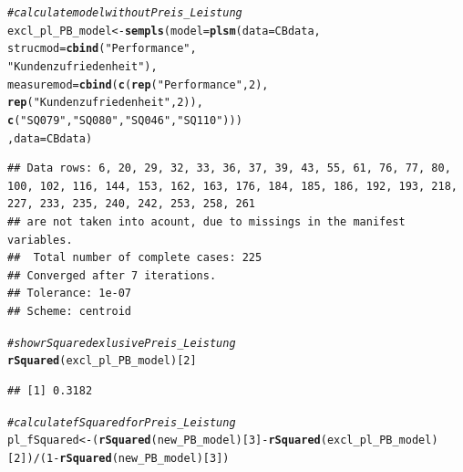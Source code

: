\documentclass{article}\usepackage[]{graphicx}\usepackage[]{color}
\makeatletter
\newcommand{\hlnum}[1]{\textcolor[rgb]{0.686,0.059,0.569}{#1}}%
\newcommand{\hlstr}[1]{\textcolor[rgb]{0.192,0.494,0.8}{#1}}%
\newcommand{\hlcom}[1]{\textcolor[rgb]{0.678,0.584,0.686}{\textit{#1}}}%
\newcommand{\hlopt}[1]{\textcolor[rgb]{0,0,0}{#1}}%
\newcommand{\hlstd}[1]{\textcolor[rgb]{0.345,0.345,0.345}{#1}}%
\newcommand{\hlkwb}[1]{\textcolor[rgb]{0.69,0.353,0.396}{#1}}%
\newcommand{\hlkwc}[1]{\textcolor[rgb]{0.333,0.667,0.333}{#1}}%
\newcommand{\hlkwd}[1]{\textcolor[rgb]{0.737,0.353,0.396}{\textbf{#1}}}%
\newenvironment{kframe}{%
 \def\at@end@of@kframe{}%
 \ifinner\ifhmode%
  \def\at@end@of@kframe{\end{minipage}}%
  \begin{minipage}{\columnwidth}%
 \fi\fi%
 \def\FrameCommand##1{\hskip\@totalleftmargin \hskip-\fboxsep
 \colorbox{shadecolor}{##1}\hskip-\fboxsep
     \hskip-\linewidth \hskip-\@totalleftmargin \hskip\columnwidth}%
 \MakeFramed {\advance\hsize-\width
   \@totalleftmargin\z@ \linewidth\hsize
   \@setminipage}}%
 {\par\unskip\endMakeFramed%
 \at@end@of@kframe}
\newenvironment{knitrout}{}{} %
\makeatother
\begin{document}
\begin{knitrout}
\color{fgcolor}\begin{kframe}
\begin{alltt}
\hlcom{#calculate model without Preis_Leistung}
\hlstd{excl_pl_PB_model} \hlkwb{<-} \hlkwd{sempls}\hlstd{(}\hlkwc{model} \hlstd{=} \hlkwd{plsm}\hlstd{(}\hlkwc{data} \hlstd{= CBdata,}
                \hlkwc{strucmod} \hlstd{=} \hlkwd{cbind}\hlstd{(}\hlstr{"Performance"}\hlstd{,}
                                 \hlstr{"Kundenzufriedenheit"}\hlstd{),}
                \hlkwc{measuremod} \hlstd{=} \hlkwd{cbind}\hlstd{(}\hlkwd{c}\hlstd{(}\hlkwd{rep}\hlstd{(}\hlstr{"Performance"}\hlstd{,}\hlnum{2}\hlstd{),}
                                     \hlkwd{rep}\hlstd{(}\hlstr{"Kundenzufriedenheit"}\hlstd{,}\hlnum{2}\hlstd{)),}
                                   \hlkwd{c}\hlstd{(}\hlstr{"SQ079"}\hlstd{,}\hlstr{"SQ080"}\hlstd{,}\hlstr{"SQ046"}\hlstd{,}\hlstr{"SQ110"}\hlstd{)))}
                \hlstd{,}\hlkwc{data} \hlstd{= CBdata)}
\end{alltt}
\begin{verbatim}
## Data rows: 6, 20, 29, 32, 33, 36, 37, 39, 43, 55, 61, 76, 77, 80, 100, 102, 116, 144, 153, 162, 163, 176, 184, 185, 186, 192, 193, 218, 227, 233, 235, 240, 242, 253, 258, 261 
## are not taken into acount, due to missings in the manifest variables.
##  Total number of complete cases: 225 
## Converged after 7 iterations.
## Tolerance: 1e-07
## Scheme: centroid
\end{verbatim}
\begin{alltt}
\hlcom{#show rSquared exlusive Preis_Leistung}
\hlkwd{rSquared}\hlstd{(excl_pl_PB_model)[}\hlnum{2}\hlstd{]}
\end{alltt}
\begin{verbatim}
## [1] 0.3182
\end{verbatim}
\begin{alltt}
\hlcom{#calculate fSquared for Preis_Leistung  }
\hlstd{pl_fSquared} \hlkwb{<-}   \hlstd{(}\hlkwd{rSquared}\hlstd{(new_PB_model)[}\hlnum{3}\hlstd{]}\hlopt{-}\hlkwd{rSquared}\hlstd{(excl_pl_PB_model)[}\hlnum{2}\hlstd{])}\hlopt{/}\hlstd{(}\hlnum{1}\hlopt{-}\hlkwd{rSquared}\hlstd{(new_PB_model)[}\hlnum{3}\hlstd{])}


\end{alltt}
\end{kframe}
\end{knitrout}
\end{document}
